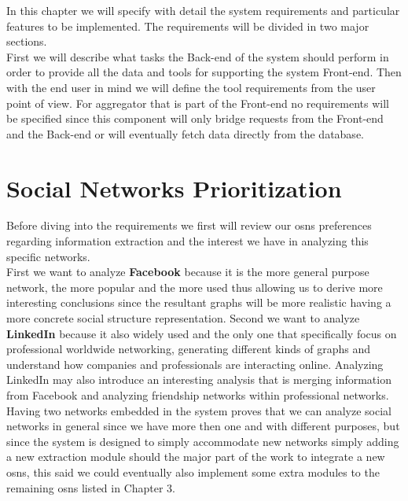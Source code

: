 In this chapter we will specify with detail the system requirements and particular features to be implemented. The requirements
will be divided in two major sections.\\
\indent First we will describe what tasks the Back-end of the system should perform in order to provide
all the data and tools for supporting the system Front-end. Then with the end user in mind we will define the tool requirements from
the user point of view. For aggregator that is part of the Front-end no requirements will be specified since this component will only bridge
requests from the Front-end and the Back-end or will eventually fetch data directly from the database.\\

\section{Social Networks Prioritization}
Before diving into the requirements we first will review our \glspl{osn} preferences regarding information extraction and the
interest we have in analyzing this specific networks.\\
\indent First we want to analyze \textbf{Facebook} because it is the more general purpose network, the more popular and the more used
thus allowing us to derive more interesting conclusions since the resultant graphs will be more realistic having a more concrete social structure
representation. Second we want to analyze \textbf{LinkedIn} because it also widely used and the only one that specifically
focus on professional worldwide networking, generating different kinds of graphs and understand how companies and professionals
are interacting online. Analyzing LinkedIn may also introduce an interesting analysis that is merging information from Facebook and
analyzing friendship networks within professional networks.\\
\indent Having two networks embedded in the system proves that we can analyze social networks in general since we have more
then one and with different purposes, but since the system is designed to simply accommodate new networks simply adding
a new extraction module should the major part of the work to integrate a new \glspl{osn}, this said we could eventually
also implement some extra modules to the remaining \glspl{osn} listed in Chapter 3.




